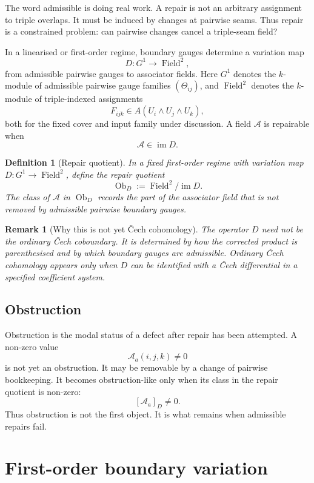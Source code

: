 \documentclass[11pt]{article}
\newtheorem{definition}[theorem]{Definition}
\newtheorem{remark}[theorem]{Remark}
\newcommand{\im}{\operatorname{im}}
\newcommand{\Field}{\operatorname{Field}}
\newcommand{\Ob}{\operatorname{Ob}}
\begin{document}
The word admissible is doing real work. A repair is not an arbitrary assignment to triple overlaps. It must be induced by changes at pairwise seams. Thus repair is a constrained problem: can pairwise changes cancel a triple-seam field?

In a linearised or first-order regime, boundary gauges determine a variation map
\[
D:G^1\to \Field^2,
\]
from admissible pairwise gauges to associator fields. Here \(G^1\) denotes the \(k\)-module of admissible pairwise gauge families \((\Theta_{ij})\), and \(\Field^2\) denotes the \(k\)-module of triple-indexed assignments
\[
F_{ijk}\in A(U_i\wedge U_j\wedge U_k),
\]
both for the fixed cover and input family under discussion. A field \(\mathcal A\) is repairable when
\[
\mathcal A\in \im D.
\]

\begin{definition}[Repair quotient]
In a fixed first-order regime with variation map \(D:G^1\to \Field^2\), define the repair quotient
\[
\Ob_D:=\Field^2/\im D.
\]
The class of \(\mathcal A\) in \(\Ob_D\) records the part of the associator field that is not removed by admissible pairwise boundary gauges.
\end{definition}

\begin{remark}[Why this is not yet \v{C}ech cohomology]
The operator \(D\) need not be the ordinary \v{C}ech coboundary. It is determined by how the corrected product is parenthesised and by which boundary gauges are admissible. Ordinary \v{C}ech cohomology appears only when \(D\) can be identified with a \v{C}ech differential in a specified coefficient system.
\end{remark}

\subsection{Obstruction}

Obstruction is the modal status of a defect after repair has been attempted. A non-zero value
\[
\mathcal A_a(i,j,k)\neq 0
\]
is not yet an obstruction. It may be removable by a change of pairwise bookkeeping. It becomes obstruction-like only when its class in the repair quotient is non-zero:
\[
[\mathcal A_a]_D\neq 0.
\]
Thus obstruction is not the first object. It is what remains when admissible repairs fail.

\section{First-order boundary variation}\label{sec:first-order}
\end{document}
